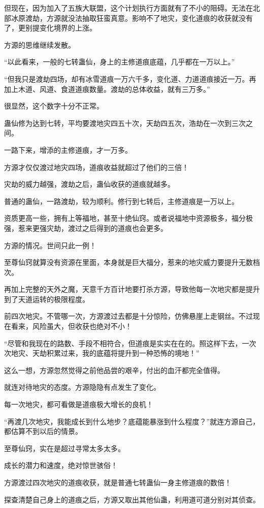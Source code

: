 \begin{this_body}
但现在，因为加入了五族大联盟，这个计划执行方面就有了不小的阻碍。无法在北部冰原渡劫，方源就没法抽取狂蛮真意。影响不了地灾，变化道痕的收获就没有了，更别提变化境界的上涨。

方源的思维继续发散。

“以此看来，一般的七转蛊仙，身上的主修道痕底蕴，几乎都在一万以上。”

“但我只是渡劫四场，却有冰雪道痕一万六千多，变化道、力道道痕接近一万。再加上木道、风道、食道道痕数量。渡劫的总体收益，就有三万多。”

很显然，这个数字十分不正常。

蛊仙修为达到七转，平均要渡地灾四五十次，天劫四五次，浩劫在一次到三次之间。

一路下来，增添的主修道痕，才一万多。

方源才仅仅渡过地灾四场，道痕收益就超过了他们的三倍！

灾劫的威力越强，渡劫之后，蛊仙收获的道痕就越多。

普通的蛊仙，一路渡劫，较为顺利。修行到七转后，主修道痕是一万以上。

资质更高一些，拥有上等福地，甚至十绝仙窍。或者说福地中资源极多，福分极强，惹来更强灾劫，渡过之后得到的道痕也会更多。

方源的情况。世间只此一例！

至尊仙窍就算没有资源在里面，本身就是巨大福分，惹来的地灾威力要提升无数档次。

再加上完整的天外之魔，天意千方百计地要打杀方源，导致他每一次地灾都是提升到了天道运转的极限程度。

前四次地灾。不管哪一次，方源渡过去都是十分惊险，仿佛悬崖上走钢丝。不过现在看来，风险虽大，但收获也绝对不小！

“尽管和我现在的路数、手段不相符合，但道痕是实实在在的。照这样下去，一次次地灾、天劫积累过来，我的底蕴将提升到一种恐怖的境地！”

这么一想，方源忽然觉得之前他品尝的艰辛，付出的血汗都完全值得。

就连对待地灾的态度。方源隐隐有点发生了变化。

每一次地灾，都可看做是道痕极大增长的良机！

“再渡几次地灾，我能成长到什么地步？底蕴能暴涨到什么程度？”就连方源自己，都估算不到以后的情景。

至尊仙窍，实在是超过寻常太多太多。

成长的潜力和速度，绝对惊世骇俗！

方源渡过四次地灾的道痕收获，就是普通七转蛊仙一身主修道痕的数倍！

探查清楚自己身上的道痕之后，方源又取出其他仙蛊，利用道可道分别对其侦查。


\end{this_body}

